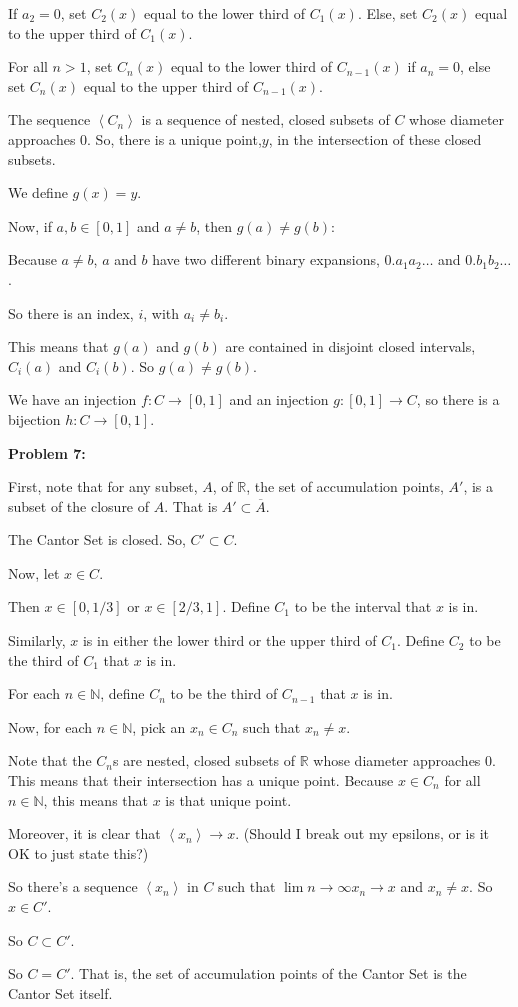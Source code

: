 \documentclass[a4paper,12pt]{article}
\newcommand{\tab}{\hspace{4mm}} %
\newcommand{\shunt}{\vspace{20mm}}
\newcommand{\anbrack}[1]{\left\langle #1 \right\rangle}
\newcommand{\N}{\mathbb{N}}
\newcommand{\R}{\mathbb{R}}
\begin{document}
\tab \tab If $a_2 = 0$, set $C_2(x)$ equal to the lower third of $C_1(x)$. Else, set $C_2(x)$ equal to the upper third of $C_1(x)$.

\tab \tab For all $n > 1$, set $C_n(x)$ equal to the lower third of $C_{n-1}(x)$ if $a_n = 0$, else set $C_n(x)$ equal to the upper third of $C_{n-1}(x)$.

\tab The sequence $\anbrack{C_n}$ is a sequence of nested, closed subsets of $C$ whose diameter approaches $0$. So, there is a unique point,$y$, in the intersection of these closed subsets.

\tab We define $g(x) = y$.

\tab Now, if $a, b \in [0,1]$ and $a \neq b$, then $g(a) \neq g(b)$:

\tab \tab Because $a \neq b$, $a$ and $b$ have two different binary expansions, $0.a_1a_2 \ldots $ and $0.b_1b_2 \ldots$.

\tab \tab So there is an index, $i$, with $a_i \neq b_i$.

\tab \tab This means that $g(a)$ and $g(b)$ are contained in disjoint closed intervals, $C_i(a)$ and $C_i(b)$. So $g(a) \neq g(b)$.

We have an injection $f: C \to [0,1]$ and an injection $g: [0,1] \to C$, so there is a bijection $h: C \to [0,1]$.

\shunt

{\bf Problem 7:}

First, note that for any subset, $A$, of $\R$, the set of accumulation points, $A'$, is a subset of the closure of $A$. That is $A' \subset \overline{A}$.

The Cantor Set is closed. So, $C' \subset C$.

Now, let $x \in C$.

\tab Then $x \in [0,1/3]$ or $x \in [2/3, 1]$. Define $C_1$ to be the interval that $x$ is in.

\tab Similarly, $x$ is in either the lower third or the upper third of $C_1$. Define $C_2$ to be the third of $C_1$ that $x$ is in.

\tab For each $n \in \N$, define $C_n$ to be the third of $C_{n-1}$ that $x$ is in.

\tab Now, for each $n \in \N$, pick an $x_n \in C_n$ such that $x_n \neq x$.

\tab Note that the $C_n$s are nested, closed subsets of $\R$ whose diameter approaches $0$. This means that their intersection has a unique point. Because $x \in C_n$ for all $n \in \N$, this means that $x$ is that unique point.

\tab Moreover, it is clear that $\anbrack{x_n} \to x$. (Should I break out my epsilons, or is it OK to just state this?)

\tab So there's a sequence $\anbrack{x_n}$ in $C$ such that $\lim\limits{n \to \infty} x_n \to x$ and $x_n \neq x$. So $x \in C'$.

So $C \subset C'$.

So $C = C'$. That is, the set of accumulation points of the Cantor Set is the Cantor Set itself.

\shunt
\end{document}
